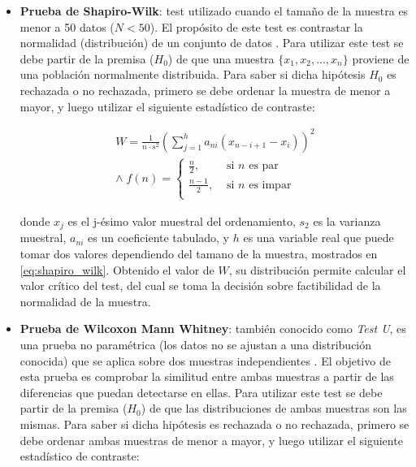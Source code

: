 \begin{enumerate}
\begin{itemize}
        \begin{itemize}
            \item \textbf{Prueba de Shapiro-Wilk}: test utilizado cuando el tamaño de la muestra es menor a 50 datos ($N < 50$). El propósito de este test es contrastar la normalidad (distribución) de un conjunto de datos \cite{Hanusz_Tarasinska_Zielinski_2016}. Para utilizar este test se debe partir de la premisa ($H_0$) de que una muestra $\{x_1, x_2, ..., x_n\}$ proviene de una población normalmente distribuida. Para saber si dicha hipótesis $H_0$ es rechazada o no rechazada, primero se debe ordenar la muestra de menor a mayor, y luego utilizar el siguiente estadístico de contraste:

            \begin{gather*}  \label{eq:shapiro_wilk}
                W = \frac{1}{n \cdot s^2} ( \sum_{j=1}^{h} a_{ni} (x_{n-i+1} - x_i))^2 \\
                \wedge \;
                f(n) =  \begin{cases}
                    \frac{n}{2},  & \text{ si } n \text{ es par} \\
                    \frac{n-1}{2}, & \text{ si } n \text{ es impar} \\
                \end{cases}
            \end{gather*}

            donde $x_j$ es el j-ésimo valor muestral del ordenamiento, $s_2$ es la varianza muestral, $a_{ni}$ es un coeficiente tabulado, y $h$ es una variable real que puede tomar dos valores dependiendo del tamano de la muestra, mostrados en \ref{eq:shapiro_wilk}. Obtenido el valor de $W$, su distribución permite calcular el valor crítico del test, del cual se toma la decisión sobre factibilidad de la normalidad de la muestra.

            \item \textbf{Prueba de Wilcoxon Mann Whitney}: también conocido como \textit{Test U}, es una prueba no paramétrica (los datos no se ajustan a una distribución conocida) que se aplica sobre dos muestras independientes \cite{fagerland2009wilcoxon}. El objetivo de esta prueba es comprobar la similitud entre ambas muestras a partir de las diferencias que puedan detectarse en ellas. Para utilizar este test se debe partir de la premisa ($H_0$) de que las distribuciones de ambas muestras son las mismas. Para saber si dicha hipótesis es rechazada o no rechazada, primero se debe ordenar ambas muestras de menor a mayor, y luego utilizar el siguiente estadístico de contraste:


\end{itemize}
\end{itemize}
\end{enumerate}
